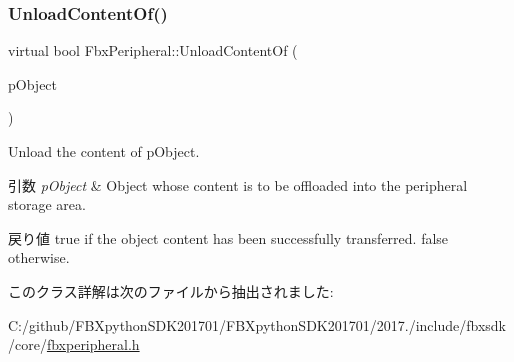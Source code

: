 \subsubsection{\texorpdfstring{Unload\+Content\+Of()}{UnloadContentOf()}}
{\footnotesize\ttfamily virtual bool Fbx\+Peripheral\+::\+Unload\+Content\+Of (\begin{DoxyParamCaption}\item[{\hyperlink{class_fbx_object}{Fbx\+Object} $\ast$}]{p\+Object }\end{DoxyParamCaption})\hspace{0.3cm}{\ttfamily [pure virtual]}}

Unload the content of p\+Object. 
\begin{DoxyParams}{引数}
{\em p\+Object} & Object whose content is to be offloaded into the peripheral storage area. \\
\hline
\end{DoxyParams}
\begin{DoxyReturn}{戻り値}
{\ttfamily true} if the object content has been successfully transferred. {\ttfamily false} otherwise. 
\end{DoxyReturn}


このクラス詳解は次のファイルから抽出されました\+:\begin{DoxyCompactItemize}
\item 
C\+:/github/\+F\+B\+Xpython\+S\+D\+K201701/\+F\+B\+Xpython\+S\+D\+K201701/2017./include/fbxsdk/core/\hyperlink{fbxperipheral_8h}{fbxperipheral.\+h}\end{DoxyCompactItemize}
